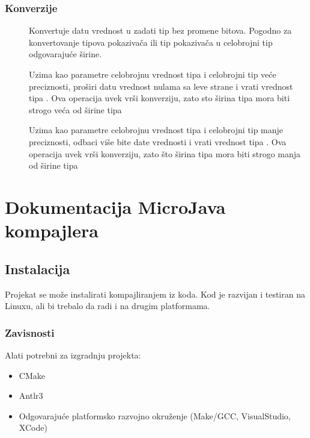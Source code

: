 \subsection*{Konverzije}

\begin{description}
\item[] Konvertuje datu vrednost u zadati tip bez promene bitova. Pogodno za konvertovanje tipova pokazivača ili tip pokazivača u celobrojni tip odgovarajuće širine.
\item[]
\item[] Uzima kao parametre celobrojnu vrednost tipa  i celobrojni tip  veće preciznosti, proširi datu vrednost nulama sa leve strane i vrati vrednost tipa . Ova operacija uvek vrši konverziju, zato sto širina tipa  mora biti strogo veća od širine tipa 
\item[] Uzima kao parametre celobrojnu vrednost tipa  i celobrojni tip  manje preciznosti, odbaci više bite date vrednosti i vrati vrednost tipa . Ova operacija uvek vrši konverziju, zato što širina tipa  mora biti strogo manja od širine tipa 
\end{description}



\chapter{Dokumentacija MicroJava kompajlera}

\section{Instalacija}

Projekat se može instalirati kompajliranjem iz koda. Kod je razvijan i testiran
na Linuxu, ali bi trebalo da radi i na drugim platformama.

\subsection*{Zavisnosti}

Alati potrebni za izgradnju projekta:
\begin{itemize}
\item CMake
\item Antlr3
\item Odgovarajuće platformsko razvojno okruženje (Make/GCC, VisualStudio, XCode)
\end{itemize}

